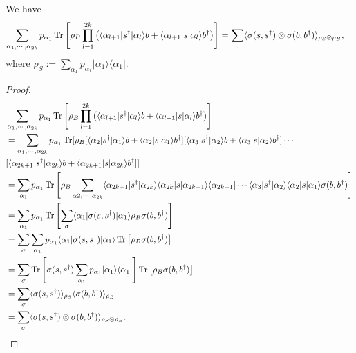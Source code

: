 \documentclass[../../note.tex]{subfiles}
\begin{document}
\begin{lemma}
    We have
    \begin{align}
        \sum_{\alpha_1, \cdots, \alpha_{2k}} p_{\alpha_1} \operatorname{Tr}\left[\rho_B \prod_{l=1}^{2k} \left(\langle \alpha_{l+1} \vert s^\dagger \vert \alpha_l \rangle b + \langle \alpha_{l+1} \vert s \vert \alpha_l \rangle b^\dagger \right)\right] 
        &= \sum_{\sigma} \langle \sigma(s, s^\dagger) \otimes \sigma(b, b^\dagger) \rangle_{\rho_S \otimes \rho_B},
    \end{align}
    where $\rho_S:= \sum_{\alpha_1} p_{\alpha_1} \vert \alpha_1 \rangle \langle \alpha_1 \vert$.
\end{lemma}
\begin{proof}
    \begin{align}
        &\sum_{\alpha_1, \cdots, \alpha_{2k}} p_{\alpha_1} \operatorname{Tr}\left[\rho_B \prod_{l=1}^{2k} \left(\langle \alpha_{l+1} \vert s^\dagger \vert \alpha_l \rangle b + \langle \alpha_{l+1} \vert s \vert \alpha_l \rangle b^\dagger \right)\right] \\
        &= \sum_{\alpha_1, \cdots, \alpha_{2k}} p_{\alpha_1} \operatorname{Tr}[\rho_B [\langle \alpha_2 \vert s^\dagger \vert \alpha_1 \rangle b + \langle \alpha_2 \vert s \vert \alpha_1 \rangle b^\dagger] [\langle \alpha_3 \vert s^\dagger \vert \alpha_2 \rangle b + \langle \alpha_3 \vert s \vert \alpha_2 \rangle b^\dagger] \cdots \nonumber \\
        &[\langle \alpha_{2k+1} \vert s^\dagger \vert \alpha_{2k} \rangle b + \langle \alpha_{2k+1} \vert s \vert \alpha_{2k} \rangle b^\dagger]] \\
        &= \sum_{\alpha_1} p_{\alpha_1} \operatorname{Tr}\left[\rho_B \sum_{\alpha{2}, \cdots, \alpha_{2k}} \langle \alpha_{2k+1} \vert s^\dagger \vert \alpha_{2k} \rangle \langle \alpha_{2k} \vert s \vert \alpha_{2k-1} \rangle \langle \alpha_{2k-1} \vert \cdots \langle \alpha_3 \vert s^\dagger \vert \alpha_2 \rangle \langle \alpha_2 \vert s \vert \alpha_1 \rangle \sigma(b, b^\dagger)\right] \\
        &= \sum_{\alpha_1} p_{\alpha_1} \operatorname{Tr}\left[\sum_{\sigma}\langle \alpha_1 \vert \sigma(s, s^\dagger) \vert \alpha_1 \rangle \rho_B \sigma(b, b^\dagger)\right] \\
        &= \sum_{\sigma} \sum_{\alpha_1} p_{\alpha_1} \langle \alpha_1 \vert \sigma(s, s^\dagger) \vert \alpha_1 \rangle \operatorname{Tr}\left[\rho_B \sigma(b, b^\dagger) \right] \\
        &= \sum_{\sigma} \operatorname{Tr}\left[\sigma(s, s^\dagger) \sum_{\alpha_1} p_{\alpha_1} \vert \alpha_1 \rangle \langle \alpha_1 \vert \right] \operatorname{Tr}\left[\rho_B \sigma(b, b^\dagger)\right] \\
        &= \sum_{\sigma} \langle \sigma(s, s^\dagger) \rangle_{\rho_S} \langle \sigma(b, b^\dagger) \rangle_{\rho_B} \\
        &= \sum_{\sigma} \langle \sigma(s, s^\dagger) \otimes \sigma(b, b^\dagger) \rangle_{\rho_S \otimes \rho_B}.
    \end{align}
\end{proof}
\end{document}
